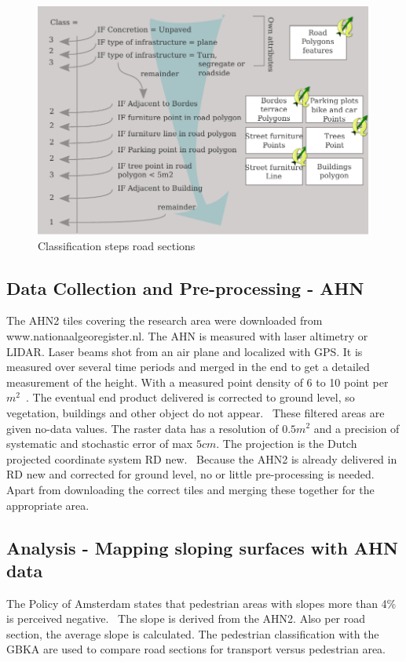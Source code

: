 \begin{figure}[ht]
\includegraphics[width=\textwidth]{img/M_Pedestrianareaclassification.pdf}
\centering
\caption{ Classification steps road sections\label{classRoad}}
\end{figure}


\subsection{Data Collection and Pre-processing - AHN }
The AHN2 tiles covering the research area were downloaded from www.nationaalgeoregister.nl. The AHN is measured with laser altimetry or LIDAR. Laser beams shot from an air plane and localized with GPS. It is measured over several time periods and merged in the end to get a detailed measurement of the height. With a measured point density of 6 to 10 point per $m^2$~\cite{VanDerZon2013}. The eventual end product delivered is corrected to ground level, so vegetation, buildings and other object do not appear.~\cite{VanDerZon2013} These filtered areas are given no-data values. The raster data has a resolution of $0.5m^2$ and a precision of systematic and stochastic error of max $5cm$. The projection is the Dutch projected coordinate system RD new.~\cite{VanDerZon2013} Because the AHN2 is already delivered in RD new and corrected for ground level, no or little pre-processing is needed. Apart from downloading the correct tiles and merging these together for the appropriate area. 

\subsection{Analysis - Mapping sloping surfaces with AHN data}
The Policy of Amsterdam states that pedestrian areas with slopes more than 4\% is perceived negative.~\cite{leidraad2011}
The slope is derived from the AHN2. Also per road section, the average slope is calculated. The pedestrian classification with the GBKA are used to compare road sections for transport versus pedestrian area. 

